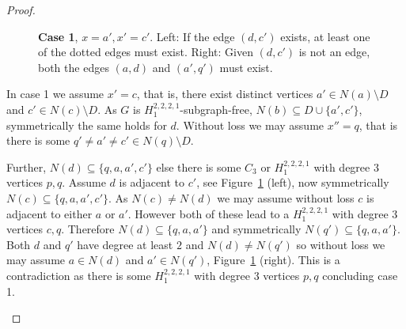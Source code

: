 \documentclass[a4paper,UKenglish,cleveref, autoref,thm-restate]{lipics-v2021}
\begin{document}
\begin{proof}
\begin{figure}

\caption{\textbf{Case 1}, $x=a',x'=c'$. Left: If the edge $(d,c')$ exists, at least one of the dotted edges must exist. Right: Given $(d,c')$ is not an edge, both the edges $(a,d)$ and $(a',q')$ must exist.}
\label{fig:case1}
\end{figure}

In case 1 we assume $x'=c$, that is, there exist distinct vertices  $a' \in N(a) \setminus D$ and $c' \in N(c) \setminus D$. As $G$ is $H_1^{2,2,2,1}$-subgraph-free, $N(b) \subseteq D \cup \{a',c'\}$, symmetrically the same holds for $d$. Without loss we may assume $x'' =q$, that is there is some $q' \neq a' \neq c' \in N(q) \setminus D$. 

Further, $N(d) \subseteq \{q,a,a',c'\}$ else there is some $C_3$ or $H_1^{2,2,2,1}$ with degree 3 vertices $p,q$. Assume $d$ is adjacent to $c'$, see Figure~\ref{fig:case1} (left), now symmetrically $N(c) \subseteq \{q, a,a',c'\}$. As $N(c) \neq N(d)$ we may assume without loss $c$ is adjacent to either $a$ or $a'$. However both of these lead to a $H_1^{2,2,2,1}$ with degree $3$ vertices $c,q$. Therefore $N(d) \subseteq \{q, a,a'\}$ and symmetrically $N(q') \subseteq \{q, a,a'\}$. Both $d$ and $q'$ have degree at least $2$ and $N(d) \neq N(q')$ so without loss we may assume $a \in N(d)$ and $a' \in N(q')$, Figure~\ref{fig:case1} (right). This is a contradiction as there is some $H_1^{2,2,2,1}$ with degree 3 vertices $p,q$ concluding case 1.

\begin{figure}
    \centering
\end{figure}
\end{proof}
\end{document}

